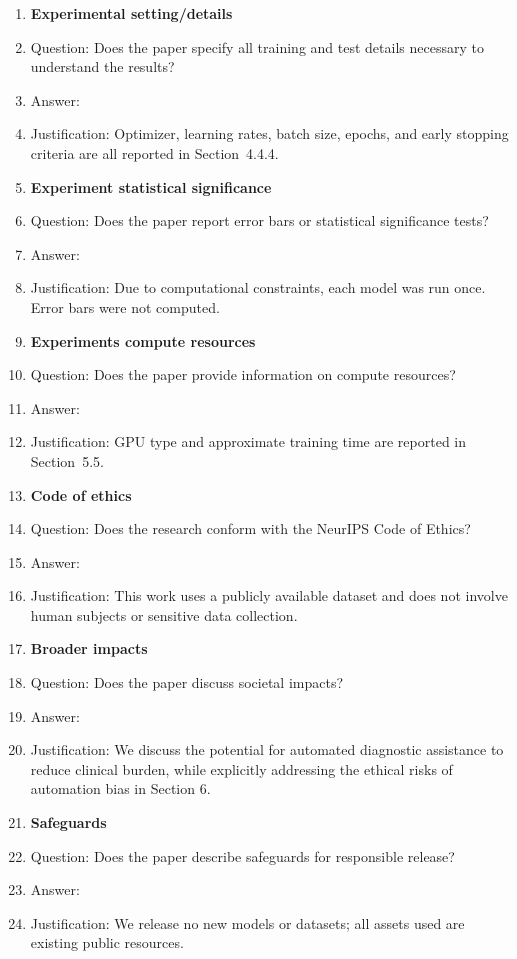 \documentclass{article}
\begin{document}
{\begin{enumerate}
\item {\bf Experimental setting/details}
    \item[] Question: Does the paper specify all training and test details necessary to understand the results?
    \item[] Answer: \answerYes{}
    \item[] Justification: Optimizer, learning rates, batch size, epochs, and early stopping criteria are all reported in Section~4.4.4.

\item {\bf Experiment statistical significance}
    \item[] Question: Does the paper report error bars or statistical significance tests?
    \item[] Answer: \answerNo{}
    \item[] Justification: Due to computational constraints, each model was run once. Error bars were not computed.

\item {\bf Experiments compute resources}
    \item[] Question: Does the paper provide information on compute resources?
    \item[] Answer: \answerYes{}
    \item[] Justification: GPU type and approximate training time are reported in Section~5.5.

\item {\bf Code of ethics}
    \item[] Question: Does the research conform with the NeurIPS Code of Ethics?
    \item[] Answer: \answerYes{}
    \item[] Justification: This work uses a publicly available dataset and does not involve human subjects or sensitive data collection.

\item {\bf Broader impacts}
    \item[] Question: Does the paper discuss societal impacts?
    \item[] Answer: \answerYes{}
    \item[] Justification: We discuss the potential for automated diagnostic assistance to reduce clinical burden, while explicitly addressing the ethical risks of automation bias in Section 6.

\item {\bf Safeguards}
    \item[] Question: Does the paper describe safeguards for responsible release?
    \item[] Answer: \answerNA{}
    \item[] Justification: We release no new models or datasets; all assets used are existing public resources.


\end{enumerate}}
\end{document}
